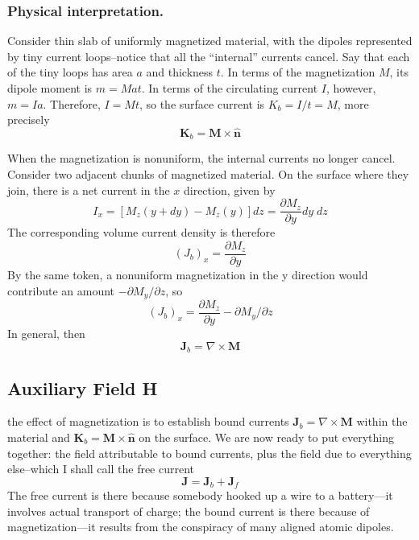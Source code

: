 \documentclass[../../../main.tex]{subfiles}
\begin{document}
\subsubsection*{Physical interpretation.} Consider thin slab of uniformly magnetized material, with the dipoles represented by tiny current loops--notice that all the “internal” currents cancel. Say that each of the tiny loops has area $a$ and thickness $t$. In terms of the magnetization $M$, its dipole moment is $m = Mat$. In terms of the circulating current $I$, however, $m = I a$. Therefore, $I = Mt$, so the surface current is $K_b = I/t = M$, more precisely 
\begin{equation*}
    \mathbf{K}_b=\mathbf{M}\times \mathbf{\hat{n}}
\end{equation*}

When the magnetization is nonuniform, the internal currents no longer cancel. Consider two adjacent chunks of magnetized material. On the surface where they join, there is a net current in the $x$ direction, given by
\begin{equation*}
    I_x = [M_z(y + dy) - M_z(y)] dz=\frac{\partial M_z}{\partial y} dy\;dz
\end{equation*}
The corresponding volume current density is therefore
\begin{equation*}
    (J_b)_x =\frac{\partial M_z}{\partial y} 
\end{equation*}
By the same token, a nonuniform magnetization in the y direction would contribute an amount $-\partial M_y/\partial z$, so
\begin{equation*}
    (J_b)_x =\frac{\partial M_z}{\partial y} -\partial M_y/\partial z
\end{equation*}
In general, then
\begin{equation*}
    \mathbf{J}_b=\nabla \times \mathbf{M}
\end{equation*}

\subsection*{Auxiliary Field H}
the effect of magnetization is to establish bound currents $ \mathbf{J}_b=\nabla \times \mathbf{M}$ within the material and $ \mathbf{K}_b=  \mathbf{M}\times\mathbf{\hat{n}}$ on the surface. We are now ready to put everything together: the ﬁeld attributable to bound currents, plus the ﬁeld due to everything else--which I shall call the free current
\begin{equation*}
    \mathbf{J}=\mathbf{J}_b+\mathbf{J}_f
\end{equation*}
The free current is there because somebody hooked up a wire to a battery—it involves actual transport of charge; the bound current is there because of magnetization—it results from the conspiracy of many aligned atomic dipoles.
\end{document}
